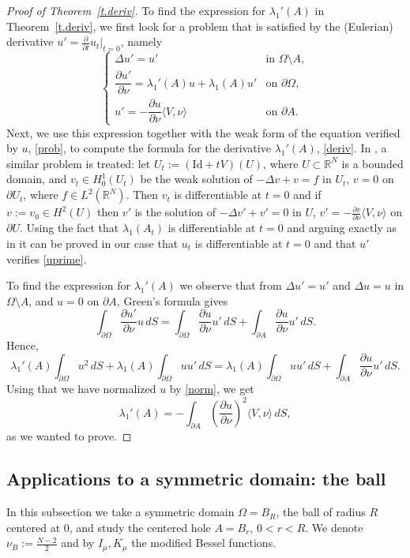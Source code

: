 \documentclass[11pt]{amsart}
\theoremstyle{remark}
\numberwithin{equation}{section}
\newcommand{\R}{\mathbb{R}}
\begin{document}
\begin{proof}[Proof of Theorem~\ref{t.deriv}]
To find the expression for $\lambda_1'(A)$ in Theorem~\ref{t.deriv}, we first look for a problem that is satisfied by the (Eulerian) derivative $u'=\frac{\partial}{\partial t}u_t|_{t=0}$, namely
\begin{equation}\label{uprime}
\begin{cases}
\Delta u'=u' & \text{in }\Omega\setminus A,\\[2pt]
\dfrac{\partial u'}{\partial\nu}=\lambda_1'(A)u+\lambda_1(A)u' & \text{on }\partial\Omega,\\[4pt]
u'=-\dfrac{\partial u}{\partial\nu}\langle V,\nu\rangle & \text{on }\partial A.
\end{cases}
\end{equation}
Next, we use this expression together with the weak form of the equation verified by $u$, \eqref{prob}, to compute the formula for the derivative $\lambda_1'(A)$, \eqref{deriv}. In \cite[Chapter~5]{HP}, a similar problem is treated: let $U_t:=(\mathrm{Id}+tV)(U)$, where $U\subset\R^N$ is a bounded domain, and $v_t\in H^1_0(U_t)$ be the weak solution of $-\Delta v+v=f$ in $U_t$, $v=0$ on $\partial U_t$, where $f\in L^2(\R^N)$. Then $v_t$ is differentiable at $t=0$ and if $v:=v_0\in H^2(U)$ then $v'$ is the solution of $-\Delta v'+v'=0$ in $U$, $v'=-\frac{\partial v}{\partial\nu}\langle V,\nu\rangle$ on $\partial U$. Using the fact that $\lambda_1(A_t)$ is differentiable at $t=0$ and arguing exactly as in \cite{HP} it can be proved in our case that $u_t$ is differentiable at $t=0$ and that $u'$ verifies \eqref{uprime}.

To find the expression for $\lambda_1'(A)$ we observe that from $\Delta u'=u'$ and $\Delta u=u$ in $\Omega\setminus A$, and $u=0$ on $\partial A$, Green's formula gives
\[
\int_{\partial\Omega}\frac{\partial u'}{\partial\nu}u\,dS=\int_{\partial\Omega}\frac{\partial u}{\partial\nu}u'\,dS+\int_{\partial A}\frac{\partial u}{\partial\nu}u'\,dS.
\]
Hence,
\[
\lambda_1'(A)\int_{\partial\Omega}u^2\,dS+\lambda_1(A)\int_{\partial\Omega}uu'\,dS=\lambda_1(A)\int_{\partial\Omega}uu'\,dS+\int_{\partial A}\frac{\partial u}{\partial\nu}u'\,dS.
\]
Using that we have normalized $u$ by \eqref{norm}, we get
\[
\lambda_1'(A)=-\int_{\partial A}\left(\frac{\partial u}{\partial\nu}\right)^2\langle V,\nu\rangle\,dS,
\]
as we wanted to prove.
\end{proof}

\subsection{Applications to a symmetric domain: the ball}
In this subsection we take a symmetric domain $\Omega=B_R$, the ball of radius $R$ centered at $0$, and study the centered hole $A=B_r$, $0<r<R$. We denote $\nu_B:=\frac{N-2}2$ and by $I_\mu,K_\mu$ the modified Bessel functions.
\end{document}
